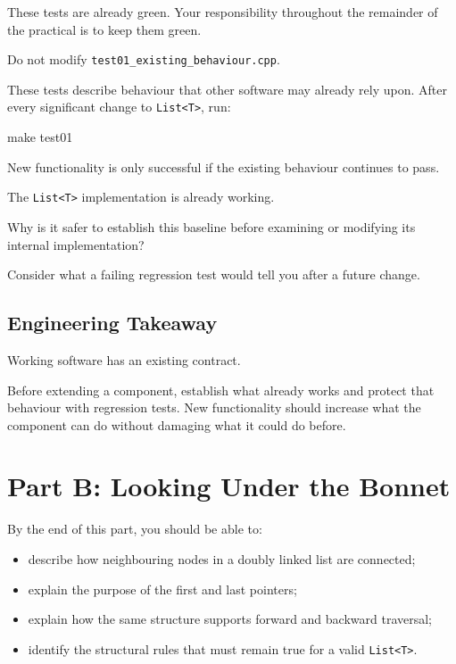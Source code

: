 \documentclass{csc2059practical}
\begin{document}
These tests are already green. Your responsibility throughout the remainder of the practical is to keep them green.


\begin{importantnote}
Do not modify \texttt{test01_existing_behaviour.cpp}.

These tests describe behaviour that other software may already rely upon. After every significant change to \texttt{List<T>}, run:

\begin{terminal}
make test01
\end{terminal}

New functionality is only successful if the existing behaviour continues to pass.
\end{importantnote}


\begin{reflectionbox}
The \texttt{List<T>} implementation is already working.

Why is it safer to establish this baseline before examining or modifying its internal implementation?

Consider what a failing regression test would tell you after a future change.
\end{reflectionbox}


\subsection{Engineering Takeaway}

Working software has an existing contract.

\begin{importantnote}
Before extending a component, establish what already works and protect that behaviour with regression tests. New functionality should increase what the component can do without damaging what it could do before.
\end{importantnote}


\section{Part B: Looking Under the Bonnet}

\begin{learningoutcomes}
By the end of this part, you should be able to:

\begin{itemize}
    \item describe how neighbouring nodes in a doubly linked list are connected;
    \item explain the purpose of the first and last pointers;
    \item explain how the same structure supports forward and backward traversal;
    \item identify the structural rules that must remain true for a valid
          \texttt{List<T>}.
\end{itemize}
\end{learningoutcomes}
\end{document}

